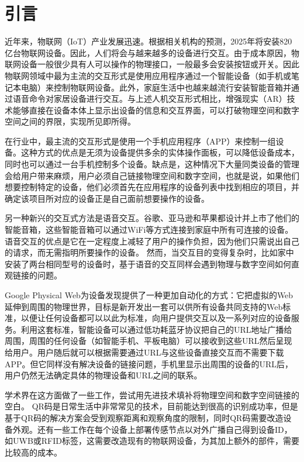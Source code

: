 \def\fr{30}
\def\edg{边缘服务端}
\def\fr{10}
\def\acc{72.7\%}
\def\idenT{93毫秒}
\def\uiT{20秒}

\chapter{引言}
\label{chap:introduction}
近年来，物联网（IoT）产业发展迅速。根据相关机构的预测\cite{macgillivray2019worldwide}，2025年将安装820亿台物联网设备。因此，人们将会与越来越多的设备进行交互。由于成本原因，物联网设备一般很少具有人可以操作的物理接口，一般最多会安装按钮或开关。因此物联网领域中最为主流的交互形式是使用应用程序通过一个智能设备（如手机或笔记本电脑）来控制物联网设备\cite{homeass,xiaomi}。此外，家庭生活中也越来越流行安装智能音箱并通过语音命令对家居设备进行交互\cite{li2019iot,porcheron2018voice}。与上述人机交互形式相比，增强现实（AR）技术能够直接在设备本体上显示出设备的信息和交互界面，可以打破物理空间和数字空间之间的界限，实现所见即所得。

在行业中，最主流的交互形式是使用一个手机应用程序（APP）来控制一组设备。这种方式的优点是无须为设备提供多余的实体操作面板，可以降低设备成本，同时也可以通过一台手机控制多个设备。缺点是，这种情况下大量同类设备的管理会给用户带来麻烦，用户必须自己链接物理空间和数字空间，也就是说，如果他们想要控制特定的设备，他们必须首先在应用程序的设备列表中找到相应的项目，并确定该项目所对应的设备正是自己面前想要操作的设备。

另一种新兴的交互式方法是语音交互。谷歌、亚马逊和苹果都设计并上市了他们的智能音箱\cite{googlehome,AmazonEcho,apple-homepod}，这些智能音箱可以通过WiFi等方式连接到家庭中所有可连接的设备。语音交互的优点是它在一定程度上减轻了用户的操作负担，因为他们只需说出自己的请求，而无需指明所要操作的设备。
然而，当交互目的变得复杂时，比如家中安装了两台相同型号的设备时，基于语音的交互同样会遇到物理与数字空间如何直观链接的问题。

Google Physical Web\cite{jenson2014physical}为设备发现提供了一种更加自动化的方式：它把虚拟的Web延伸到周围的物理世界，目标是新开发出一套可以供所有设备共同支持的Web标准，以便让任何设备都可以以此为标准，向用户提供交互以及一系列对应的设备服务。利用这套标准，智能设备可以通过低功耗蓝牙协议把自己的URL地址广播给周围，周围的任何设备（如智能手机、平板电脑）可以接收到这些URL然后呈现给用户。用户随后就可以根据需要通过URL与这些设备直接交互而不需要下载APP。但它同样没有解决设备的链接问题，手机里显示出周围的设备的URL后，用户仍然无法确定具体的物理设备和URL之间的联系。

学术界在这方面做了一些工作，尝试用先进技术填补将物理空间和数字空间链接的空白。
QR码是日常生活中非常常见的技术，目前能达到很高的识别成功率，但是基于QR码的解决方案会受到观察距离和观察角度的限制，同时QR码需要改造设备外观。还有一些工作\cite{alanwar2017selecon}在每个设备上部署传感节点以对外广播自己得到设备ID，如UWB或RFID标签，这需要改造现有的物联网设备，为其加上额外的部件，需要比较高的成本。


